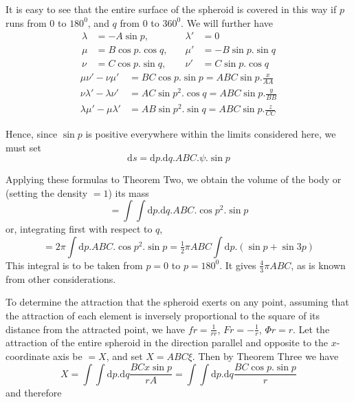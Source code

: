 \par
It is easy to see that the entire surface of the spheroid is covered in this way if $p$ runs from $0$ to $180^0$, and $q$ from $0$ to $360^0$. We will further have
\[
\begin{aligned}
\lambda&=-A\sin p, &\quad\lambda'&=0\\
\mu&=B\cos p.\cos q, &\quad\mu'&=-B\sin p.\sin q\\
\nu&=C\cos p.\sin q, &\quad\nu'&=C\sin p.\cos q
\end{aligned}
\]
\[
\begin{aligned}
\mu\nu'-\nu\mu'&=BC\cos p.\sin p=ABC\sin p.\frac{x}{AA}\\
\nu\lambda'-\lambda\nu'&=AC\sin p^2.\cos q=ABC\sin p.\frac{y}{BB}\\
\lambda\mu'-\mu\lambda'&=AB\sin p^2.\sin q=ABC\sin p.\frac{z}{CC}
\end{aligned}
\]
\par
Hence, since $\sin p$ is positive everywhere within the limits considered here, we must set
\[
\mathrm{d}s=\mathrm{d}p.\mathrm{d}q.ABC.\psi.\sin p
\]
\par
Applying these formulas to Theorem Two, we obtain the volume of the body or (setting the density $=1$) its mass
\[
=\int\!\int\mathrm{d}p.\mathrm{d}q.ABC.\cos p^2.\sin p
\]
or, integrating first with respect to $q$,
\[
=2\pi\int\mathrm{d}p.ABC.\cos p^2.\sin p=\tfrac12\pi ABC\int\mathrm{d}p.(\sin p+\sin3p)
\]
This integral is to be taken from $p=0$ to $p=180^0$. It gives $\tfrac43\pi ABC$, as is known from other considerations.

\par
To determine the attraction that the spheroid exerts on any point, assuming that the attraction of each element is inversely proportional to the square of its distance from the attracted point, we have $fr=\frac{1}{rr}$, $Fr=-\frac{1}{r}$, $\Phi r=r$. Let the attraction of the entire spheroid in the direction parallel and opposite to the $x$-coordinate axis be $=X$, and set $X=ABC\xi$. Then by Theorem Three we have
\[
X=\int\!\int\mathrm{d}p.\mathrm{d}q\frac{BCx\sin p}{rA}=\int\!\int\mathrm{d}p.\mathrm{d}q\frac{BC\cos p.\sin p}{r}
\]
and therefore

